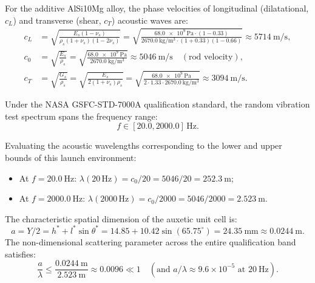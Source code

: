 For the additive AlSi10Mg alloy, the phase velocities of longitudinal (dilatational, $c_L$) and transverse (shear, $c_T$) acoustic waves are:
\begin{align}
c_L &= \sqrt{\frac{E_s (1 - \nu_s)}{\rho_s (1 + \nu_s)(1 - 2\nu_s)}} = \sqrt{\frac{\SI{68.0e9}{\pascal} \cdot (1 - 0.33)}{\SI{2670.0}{\kilo\gram\per\meter^3} \cdot (1 + 0.33)(1 - 0.66)}} \approx \SI{5714}{\meter\per\second}, \label{eq:cl_bulk} \\
c_0 &= \sqrt{\frac{E_s}{\rho_s}} = \sqrt{\frac{\SI{68.0e9}{\pascal}}{\SI{2670.0}{\kilo\gram\per\meter^3}}} \approx \SI{5046}{\meter\per\second} \quad (\text{rod velocity}), \label{eq:c0_rod} \\
c_T &= \sqrt{\frac{G_s}{\rho_s}} = \sqrt{\frac{E_s}{2(1 + \nu_s)\rho_s}} = \sqrt{\frac{\SI{68.0e9}{\pascal}}{2 \cdot 1.33 \cdot \SI{2670.0}{\kilo\gram\per\meter^3}}} \approx \SI{3094}{\meter\per\second}. \label{eq:ct_shear}
\end{align}

Under the NASA GSFC-STD-7000A qualification standard, the random vibration test spectrum spans the frequency range:
\begin{equation}
f \in [20.0, 2000.0]\,\text{Hz}.
\label{eq:gevs_band}
\end{equation}

Evaluating the acoustic wavelengths corresponding to the lower and upper bounds of this launch environment:
\begin{itemize}
\item At $f = \SI{20.0}{\hertz}$: $\lambda(20\,\text{Hz}) = c_0 / 20 = 5046 / 20 = \SI{252.3}{\meter}$;
\item At $f = \SI{2000.0}{\hertz}$: $\lambda(2000\,\text{Hz}) = c_0 / 2000 = 5046 / 2000 = \SI{2.523}{\meter}$.
\end{itemize}

The characteristic spatial dimension of the auxetic unit cell is:
\begin{equation}
a = Y / 2 = h^* + l^* \sin\theta^* = 14.85 + 10.42 \sin(65.75^\circ) = \SI{24.35}{\milli\meter} \approx \SI{0.0244}{\meter}.
\label{eq:cell_characteristic_size}
\end{equation}
The non-dimensional scattering parameter across the entire qualification band satisfies:
\begin{equation}
\frac{a}{\lambda} \le \frac{\SI{0.0244}{\meter}}{\SI{2.523}{\meter}} \approx \mathbf{0.0096} \ll 1 \quad (\text{and } a/\lambda \approx 9.6 \times 10^{-5} \text{ at } \SI{20}{\hertz}).
\label{eq:subwavelength_ratio}
\end{equation}

